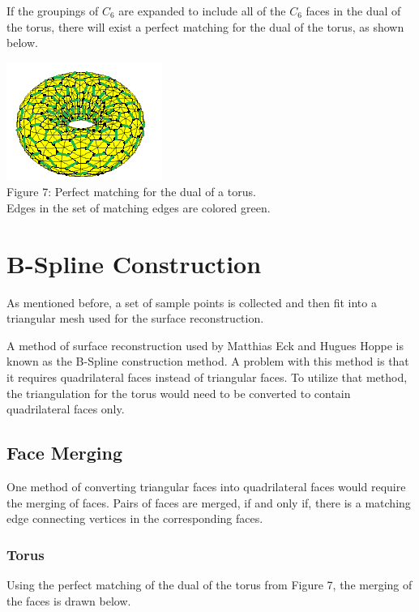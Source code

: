 \documentclass[12pt]{article}
\begin{document}
\begin{flushleft}
\medskip
If the groupings of $C_6$ are expanded to include all of the $C_6$ faces in the dual of the torus, there will exist a perfect matching for the dual of the torus, as shown below.

\begin{center}
\includegraphics[scale=1.7]{images/torusmatching.png}\\
Figure 7: Perfect matching for the dual of a torus.\\
Edges in the set of matching edges are colored green.
\end{center}

\section*{B-Spline Construction}
As mentioned before, a set of sample points is collected and then fit into a triangular mesh used for the surface reconstruction.

\medskip
A method of surface reconstruction used by Matthias Eck and Hugues Hoppe is known as the B-Spline construction method. A problem with this method is that it requires quadrilateral faces instead of triangular faces. To utilize that method, the triangulation for the torus would need to be converted to contain quadrilateral faces only.

\subsection*{Face Merging}
\medskip
One method of converting triangular faces into quadrilateral faces would require the merging of faces. Pairs of faces are merged, if and only if, there is a matching edge connecting vertices in the corresponding faces.

\subsubsection*{Torus}
Using the perfect matching of the dual of the torus from Figure 7, the merging of the faces is drawn below.


\end{flushleft}
\end{document}
